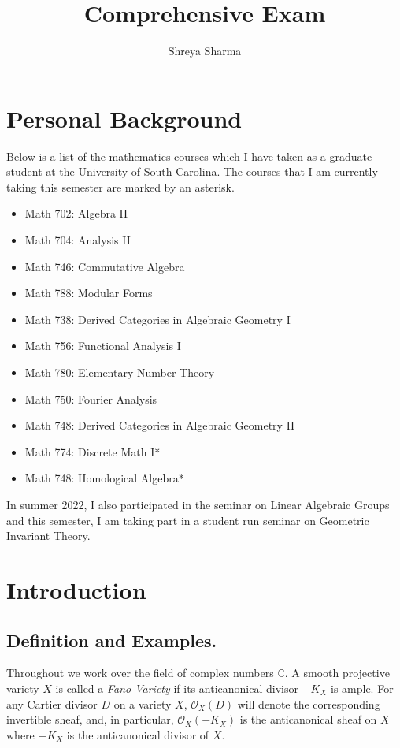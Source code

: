 \documentclass[11pt]{amsart}
\theoremstyle{plain}
\theoremstyle{definition}
\theoremstyle{expl}
\begin{document}
	\title{Comprehensive Exam}
	\date{}
	\author{\small{Shreya Sharma}}
	\maketitle
	\tableofcontents
	
\section{Personal Background}
Below is a list of the mathematics courses which I have taken as a graduate student at the University of South Carolina. The courses that I am currently taking this semester are marked by an asterisk. 
\begin{itemize}
    \item Math 702: Algebra II
    \item Math 704: Analysis II
    \item Math 746: Commutative Algebra 
    \item Math 788: Modular Forms
    \item Math 738: Derived Categories in Algebraic Geometry I
    \item Math 756: Functional Analysis I
    \item Math 780: Elementary Number Theory
    \item Math 750: Fourier Analysis
    \item Math 748: Derived Categories in Algebraic Geometry II
    \item Math 774: Discrete Math I*
    \item Math 748: Homological Algebra* 
\end{itemize}
In summer 2022, I also participated in the seminar on Linear Algebraic Groups and this semester, I am taking part in a student run seminar on Geometric Invariant Theory.
\section{Introduction}
\subsection{Definition and Examples.} Throughout we work over the field of complex numbers $\mathbb{C}$.
A smooth projective variety $X$ is called a \textit{Fano Variety} if its anticanonical divisor $-K_X$ is ample.
For any Cartier divisor $D$ on a variety $X$, $\mathcal{O}_X(D)$ will denote the corresponding invertible sheaf, and, in particular, $\mathcal{O}_X(-K_X)$ is the anticanonical sheaf on $X$ where $-K_X$ is the anticanonical divisor of $X$. 
\end{document}
